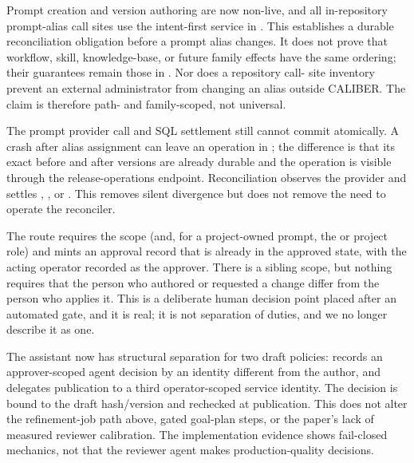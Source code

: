 Prompt creation and
version authoring are now non-live, and all in-repository prompt-alias call sites
use the intent-first service in . This establishes a durable
reconciliation obligation before a prompt alias changes. It does not prove that
workflow, skill, knowledge-base, or future family effects have the same ordering;
their guarantees remain those in . Nor does a repository call-
site inventory prevent an external administrator from changing an \mlflow{} alias
outside CALIBER. The claim is therefore path- and family-scoped, not universal.

 The prompt provider call and
SQL settlement still cannot commit atomically. A crash after alias assignment can
leave an operation in ; the difference is that its exact before and
after versions are already durable and the operation is visible through the
release-operations endpoint. Reconciliation observes the provider and settles
, , or . This removes silent
divergence but does not remove the need to operate the reconciler.

 The
route requires the \operator{} scope (and, for a project-owned prompt, the
 or  project role) and mints an approval record that is
already in the approved state, with the acting operator recorded as the approver. There is
a sibling \approver{} scope, but nothing requires that the person who authored or
requested a change differ from the person who applies it. This is a deliberate
human decision point placed after an automated gate, and it is real; it is not
separation of duties, and we no longer describe it as one.

 The assistant now has structural separation for two draft policies:
 records an approver-scoped agent decision by an identity
different from the author, and  delegates publication to a
third operator-scoped service identity. The decision is bound to the draft
hash/version and rechecked at publication. This does not alter the refinement-job
 path above, gated goal-plan steps, or the paper's lack of measured
reviewer calibration. The implementation evidence shows fail-closed mechanics, not
that the reviewer agent makes production-quality decisions.

